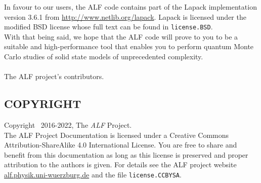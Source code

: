 In favour to our users, the ALF code contains part of the Lapack implementation version 3.6.1 from \url{http://www.netlib.org/lapack}.
Lapack is licensed under the modified BSD license whose full text can be found in \texttt{license.BSD}.\\
With that being said, we hope that the ALF code will prove to you to be a suitable and high-performance tool that enables
you to perform quantum Monte Carlo studies of solid state models of unprecedented complexity.\\
\\
The ALF project's contributors.\\
                        
\subsection*{COPYRIGHT}

Copyright \textcopyright ~2016-2022, The \textit{ALF} Project.\\
The ALF Project Documentation 
is licensed under a Creative Commons Attribution-ShareAlike 4.0 International License.
You are free to share and benefit from this documentation as long as this license is preserved and proper attribution to the authors is given. For details see the ALF project website \url{alf.physik.uni-wuerzburg.de} and the file \texttt{license.CCBYSA}.
